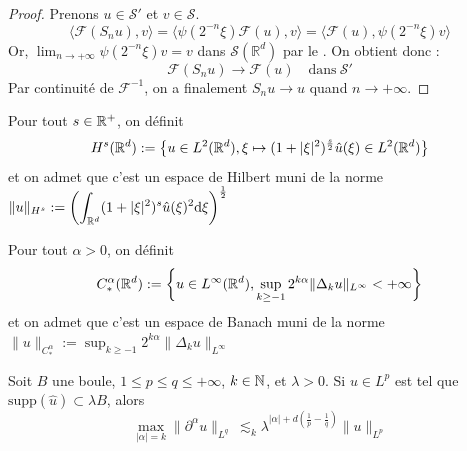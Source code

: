 \documentclass[11pt,a4paper]{article}
\begin{document}
\begin{proof}
Prenons $u \in \mathcal{S}'$ et $v \in \mathcal{S}$.
\[ \langle \mathcal{F}(S_n u), v \rangle = \langle \psi(2^{-n}\xi) \mathcal{F}(u), v \rangle = \langle \mathcal{F}(u), \psi(2^{-n}\xi) v \rangle \]
Or, $\lim_{n \to +\infty} \psi(2^{-n}\xi)v = v$ dans $\mathcal{S}(\mathbb{R}^d)$ par le . On obtient donc :
\[ \mathcal{F}(S_n u) \to \mathcal{F}(u) \quad \text{dans} \ \mathcal{S}' \]
Par continuité de $\mathcal{F}^{-1}$, on a finalement $S_n u \to u$ quand $n \to +\infty$.
\end{proof}
     
     
\begin{defin}
Pour tout $s\in \mathbb R^+$, on définit 
\begin{equation*}
H^s(\mathbb R^d) := \left\{ u\in L^2(\mathbb R^d), \xi \mapsto (1+|\xi|^2)^{\frac{s}{2}}\hat{u}(\xi) \in L^2(\mathbb R^d) \right\}
\end{equation*}
et on admet que c'est un espace de Hilbert muni de la norme $\|u\|_{H^s} := \displaystyle \left(\int_{\mathbb R^d} (1+|\xi|^2)^s\hat{u}(\xi)^2\mathrm{d}\xi \right)^\frac{1}{2}$
\end{defin}


\begin{defin}
Pour tout $\alpha > 0$, on définit 
\begin{equation*}
C^\alpha_*(\mathbb R^d) := \left\{ u\in L^\infty(\mathbb R^d), \sup_{k \geq -1} 2^{k\alpha}\|\Delta_ku\|_{L^\infty} < +\infty \right\}
\end{equation*}
et on admet que c'est un espace de Banach muni de la norme $\|u\|_{C^\alpha_*} :=  \sup_{k \geq -1} 2^{k\alpha}\|\Delta_ku\|_{L^\infty} $
\end{defin}

\begin{lemma}
Soit $B$ une boule, $1\leq p  \leq  q \leq +\infty$, $k\in \mathbb N$, et $\lambda >0$. Si $u\in L^p$ est tel que $\text{supp}(\hat{u})\subset \lambda B$, alors
\begin{equation}\label{bernstein}
\max_{|\alpha|=k}{\| \partial^\alpha u\|_{L^q}} \ \lesssim_k \lambda^{|\alpha| +d \left ( \frac{1}{p}- \frac{1}{q} \right )}\|u\|_{L^p}
\end{equation}
\end{lemma}
\end{document}
